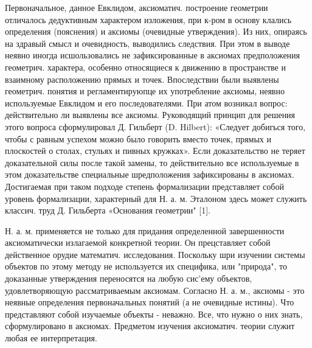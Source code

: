 \documentclass[10pt]{article}
\begin{document}
Первоначальное, данное Евклидом, аксиоматич. построение геометрии отличалось дедуктивным характером изложения, при к-ром в основу клались определения (пояснения) и аксиомы (очевидные утверждения). Из них, опираясь на здравый смысл и очевидность, выводились следствия. При этом в выводе неявно иногда исшользовались не зафиксированные в аксиомах предположения геометрич. характера, особенно относящиеся к движению в пространстве и взаимному расположению прямых и точек. Впоследствии были выявлены геометрич. понятия и регламентируюпце их употребление аксиомы, неявно используемые Евклидом и его последователями. При атом возникал вопрос: действительно ли выявлены все аксиомы. Руководящий принцип для решения этого вопроса сформулировал Д. Гильберт (D. Hilbert): «Следует добигься того, чтобы с равным успехом можно было говорить вместо точек, прямых и плоскостей о столах, стульях и пивных кружках». Если доказательство не теряет доказательной силы после такой замены, то действительно все используемые в этом доказательстве специальные шредположения зафиксированы в аксиомах. Достигаемая при таком подходе степень формализации представляет собой уровень формализации, характерный для Н. а. м. Эталоном здесь может служить классич. труд Д. Гильберта «Основания геометрии" [1].



Н. а. м. применяется не только для придания определенной завершенности аксиоматически излагаемой конкретной теории. Он прецставляет собой действенное орудие математич. исследования. Поскольку шри изучении системы объектов по этому методу не используется их специфика, или "природа", то доказанные утверждения переносятся на любую сис'ему объектов, удовлетворяющую рассматриваемым аксиомам. Согласно Н. а. м., аксиомы - это неявные определения первоначальных понятий (а не очевидные истины). Что представляют собой изучаемые объекты - неважно. Все, что нужно о них знать, сформулировано в аксиомах. Предметом изучения аксиоматич. теории служит любая ее интерпретация.
\end{document}
